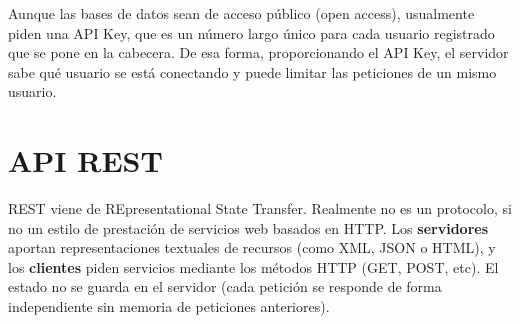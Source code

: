 Aunque las bases de datos sean de acceso público (open access), usualmente piden una API Key, que es un número largo único para cada usuario registrado que se pone en la cabecera. De esa forma, proporcionando el API Key, el servidor sabe qué usuario se está conectando y puede limitar las peticiones de un mismo usuario.

\section{API REST}
REST viene de REpresentational State Transfer. Realmente no es un protocolo, si no un estilo de prestación de servicios web basados en HTTP. 
Los \textbf{servidores} aportan representaciones textuales de recursos (como XML, JSON o HTML), y los \textbf{clientes} piden servicios mediante los métodos HTTP (GET, POST, etc). 
El estado no se guarda en el servidor (cada petición se responde de forma independiente sin memoria de peticiones anteriores).

